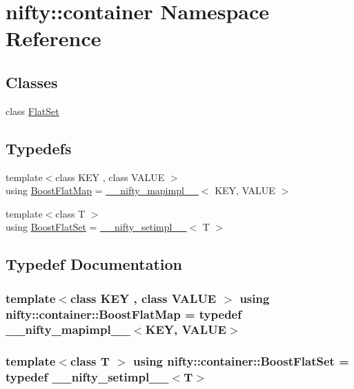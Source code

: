 \hypertarget{namespacenifty_1_1container}{}\section{nifty\+:\+:container Namespace Reference}
\label{namespacenifty_1_1container}
\subsection*{Classes}
\begin{DoxyCompactItemize}
\item 
class \hyperlink{classnifty_1_1container_1_1FlatSet}{Flat\+Set}
\end{DoxyCompactItemize}
\subsection*{Typedefs}
\begin{DoxyCompactItemize}
\item 
{\footnotesize template$<$class K\+E\+Y , class V\+A\+L\+U\+E $>$ }\\using \hyperlink{namespacenifty_1_1container_a8abdd6362500b879a071a7403f6f199a}{Boost\+Flat\+Map} = \hyperlink{boost__flat__map_8hxx_a5e8f06e6da8064e1b54cb72c7bf87b80}{\+\_\+\+\_\+nifty\+\_\+mapimpl\+\_\+\+\_\+}$<$ K\+E\+Y, V\+A\+L\+U\+E $>$
\item 
{\footnotesize template$<$class T $>$ }\\using \hyperlink{namespacenifty_1_1container_ad9f6bbba60eac29f50d418e4c09d5c7b}{Boost\+Flat\+Set} = \hyperlink{boost__flat__set_8hxx_a6b7afcb706c8e2ecfc2e7c25c7291148}{\+\_\+\+\_\+nifty\+\_\+setimpl\+\_\+\+\_\+}$<$ T $>$
\end{DoxyCompactItemize}


\subsection{Typedef Documentation}
\hypertarget{namespacenifty_1_1container_a8abdd6362500b879a071a7403f6f199a}{}
\subsubsection[{Boost\+Flat\+Map}]{\setlength{\rightskip}{0pt plus 5cm}template$<$class K\+E\+Y , class V\+A\+L\+U\+E $>$ using {\bf nifty\+::container\+::\+Boost\+Flat\+Map} = typedef {\bf \+\_\+\+\_\+nifty\+\_\+mapimpl\+\_\+\+\_\+}$<$K\+E\+Y, V\+A\+L\+U\+E$>$}\label{namespacenifty_1_1container_a8abdd6362500b879a071a7403f6f199a}
\hypertarget{namespacenifty_1_1container_ad9f6bbba60eac29f50d418e4c09d5c7b}{}
\subsubsection[{Boost\+Flat\+Set}]{\setlength{\rightskip}{0pt plus 5cm}template$<$class T $>$ using {\bf nifty\+::container\+::\+Boost\+Flat\+Set} = typedef {\bf \+\_\+\+\_\+nifty\+\_\+setimpl\+\_\+\+\_\+}$<$T$>$}\label{namespacenifty_1_1container_ad9f6bbba60eac29f50d418e4c09d5c7b}
